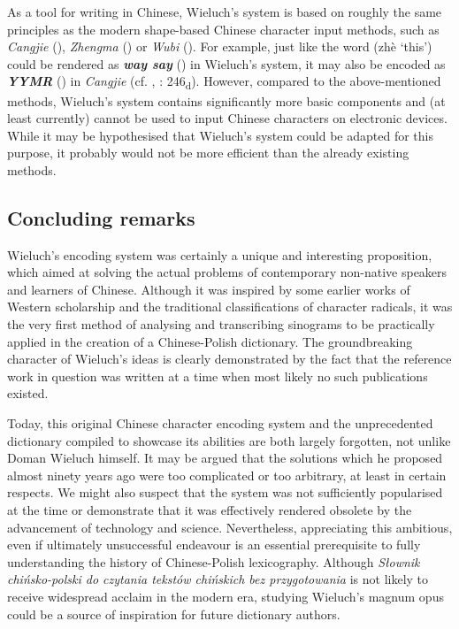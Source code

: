 \documentclass[output=paper,colorlinks,citecolor=brown,arabicfont,chinesefont]{langscibook}
\begin{document}
As a tool for writing in Chinese, Wieluch's system is based on roughly the same principles as the modern shape-based Chinese character input methods, such as \emph{Cangjie} ({}), \emph{Zhengma} ({}) or \emph{Wubi} ({}). For example, just like the word {} (zhè ‘this’) could be rendered as \textbf{\emph{way say}} ({}) in Wieluch's system, it may also be encoded as \textbf{\emph{YYMR}} ({}) in \emph{Cangjie} (cf. \citealt{[HD]}, \citealt{Wieluch1936}: 246\textsubscript{d}). However, compared to the above-mentioned methods, Wieluch's system contains significantly more basic components and (at least currently) cannot be used to input Chinese characters on electronic devices. While it may be hypothesised that Wieluch's system could be adapted for this purpose, it probably would not be more efficient than the already existing methods.

\subsection{Concluding remarks}

Wieluch's encoding system was certainly a unique and interesting proposition, which aimed at solving the actual problems of contemporary non-native speakers and learners of Chinese. Although it was inspired by some earlier works of Western scholarship and the traditional classifications of character radicals, it was the very first method of analysing and transcribing sinograms to be practically applied in the creation of a Chinese-Polish dictionary. The groundbreaking character of Wieluch's ideas is clearly demonstrated by the fact that the reference work in question was written at a time when most likely no such publications existed. 

Today, this original Chinese character encoding system and the unprecedented dictionary compiled to showcase its abilities are both largely forgotten, not unlike Doman Wieluch himself. It may be argued that the solutions which he proposed almost ninety years ago were too complicated or too arbitrary, at least in certain respects. We might also suspect that the system was not sufficiently popularised at the time or demonstrate that it was effectively rendered obsolete by the advancement of technology and science. Nevertheless, appreciating this ambitious, even if ultimately unsuccessful endeavour is an essential prerequisite to fully understanding the history of Chinese-Polish lexicography. Although \emph{Słownik chińsko-polski do czytania tekstów chińskich bez przygotowania} is not likely to receive widespread acclaim in the modern era, studying Wieluch's magnum opus could be a source of inspiration for future dictionary authors.

{\sloppy\printbibliography[heading=subbibliography,notkeyword=this]}
\end{document}
